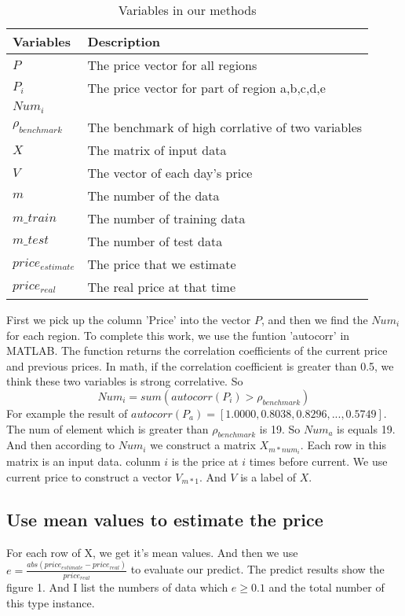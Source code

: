 \documentclass[
10pt, %
a4paper, %
oneside, %
headinclude,footinclude, %
BCOR5mm, %
]{scrartcl}
\begin{document}
\begin{table}[h]
\centering
\caption{Variables in our methods}
\begin{tabular}{ll}
\hline
Variables &Description \\ \hline
$P$          &The price vector for all regions\\
$P_i$        &The price vector for part of region a,b,c,d,e\\
$Num_i$      & \\ %
$\rho_{benchmark}$ &The benchmark of high corrlative of two variables \\
$X$          &The matrix of input data \\
$V$          &The vector of each day's price \\
$m$          &The number of the data\\
$m\_train$   &The number of training data\\
$m\_test$    & The number of test data \\
$price_{estimate}$ &The price that we estimate \\
$price_{real}$ &The real price at that time

\end{tabular}

\end{table}

First we pick up the column 'Price' into the vector $P$, and then we find the $Num_i$ for each region. To complete this work, we use the funtion 'autocorr' in MATLAB. The function returns the correlation coefficients of the current price and previous prices. In math, if the correlation coefficient is greater than 0.5, we think these two variables is strong correlative. So $$Num_i=sum(autocorr(P_i)>\rho_{benchmark})$$
For example the result of $autocorr(P_a) = [1.0000 ,0.8038 ,0.8296 ,...,0.5749]$. The num of element which is greater than $\rho_{benchmark}$ is 19. So $Num_a$ is equals 19.
And then according to $Num_i$ we construct a matrix $X_{m*num_i}$. Each row in this matrix is an input data. colunm $i$ is the price at $i$ times before current. We use current price to construct a vector $V_{m*1}$. And $V$ is a label of $X$.


\subsection{Use mean values to estimate the price}
For each row of X, we get it’s mean values. And then we use $e=\frac{abs(price_{estimate}-price_{real})}{price_{real}}$ to evaluate our predict. The predict results show the figure 1. And I list the numbers of data which $e \ge0.1$ and the total number of this type instance.
\end{document}
